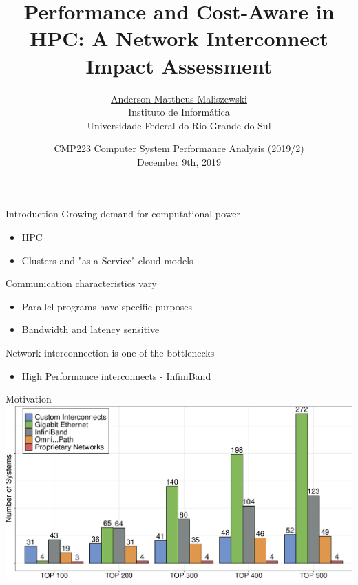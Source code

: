 \documentclass[presentation]{beamer}
\title{Performance and Cost-Aware in HPC: A Network Interconnect Impact Assessment}
\author{
\large
\underline{Anderson Mattheus Maliszewski} \\
\small
Instituto de Informática\\
Universidade Federal do Rio Grande do Sul\\
}
\date{CMP223 Computer System Performance Analysis (2019/2) \\ December 9th, 2019}
\begin{document}
\maketitle

\begin{frame}{Introduction}
\vfill
Growing demand for computational power
\begin{itemize}
\item HPC
\item Clusters and "as a Service" cloud models
\end{itemize}
\pause \vfill
Communication characteristics vary
\begin{itemize}
\item Parallel programs have specific purposes
\item Bandwidth and latency sensitive
\end{itemize}
\pause \vfill
Network interconnection is one of the \alert{bottlenecks}
\begin{itemize}
\item High Performance interconnects - InfiniBand
\end{itemize}
\end{frame}

\begin{frame}{Motivation}
    \includegraphics[width=\textwidth]{SLIDES/img/TOP500.pdf}
\end{frame}
\end{document}
